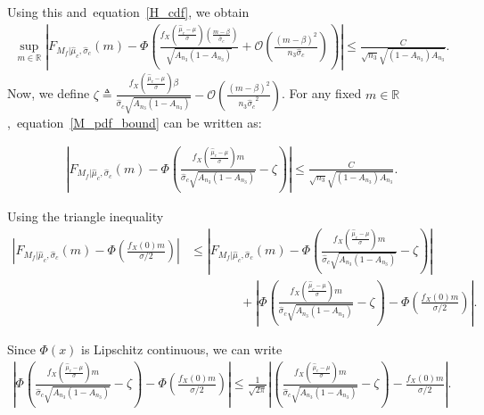 \documentclass[10pt]{article} %
\def\eqref#1{equation~\ref{#1}}
\theoremstyle{plain}
\theoremstyle{definition}
\theoremstyle{remark}
\newcommand{\bR}{\mathbb R}
\begin{document}
Using this and~\eqref{H_cdf}, we obtain
\begin{equation}
\begin{multlined}
\sup_{m \in \mathbb{R}}  \left|  F_{M_f |\hat{\mu}_c, \hat{\sigma}_c}(m) - \Phi\left(  \frac{ f_X \left(  \frac{\hat{\mu}_c - \mu}{\sigma} \right) \left( \frac{m - \beta}{\hat{\sigma}_c} \right) }{\sqrt{A_{n_3}(1-A_{n_3})}} +  \mathcal{O} \left(\frac{ (m - \beta)^2}{n_3 \hat{\sigma}_c}\right)  \right) \right |    \leq \frac{C}{\sqrt{n_3} \sqrt{(1 - A_{n_3})A_{n_3}}}. \label{M_pdf_bound}
\end{multlined}
\end{equation}
Now, we  define \( \zeta \triangleq \frac{  f_X \left(\frac{\hat{\mu}_c - \mu}{\sigma} \right) \beta }{  \hat{\sigma}_c \sqrt{A_{n_3}(1-A_{n_3})}} - \mathcal{O} \left(\frac{ (m - \beta)^2}{n_3 {\hat{\sigma}_{c}}^2}\right) \).  For any fixed \( m \in \bR \),~\eqref{M_pdf_bound} can be written as:

\begin{align}
    \left|  F_{M_f |\hat{\mu}_c, \hat{\sigma}_c}(m) - \Phi\left(  \frac{ f_X \left( \frac{\hat{\mu}_c - \mu}{\sigma} \right) m}{ \hat{\sigma}_c \sqrt{A_{n_3}(1-A_{n_3})}} - \zeta \right) \right |   \leq \frac{C}{\sqrt{n_3} \sqrt{(1 - A_{n_3})A_{n_3}}}. \label{Mf_cdf_zeta}
\end{align}

Using the triangle inequality
\begin{equation}
\begin{aligned}
  \left| F_{M_f |\hat{\mu}_c, \hat{\sigma}_c}(m)  - \Phi\left( \frac{ f_X(0) m}{ \sigma / 2 } \right) \right| 
& \leq  \left| F_{M_f |\hat{\mu}_c, \hat{\sigma}_c}(m) - \Phi\left( \frac{ f_X \left( \frac{\hat{\mu}_c - \mu}{\sigma} \right)  m}{ \hat{\sigma}_c \sqrt{A_{n_3}(1-A_{n_3})}} 
 - \zeta \right) \right|      \\  &\qquad \qquad + \left| \Phi\left(  \frac{ f_X \left( \frac{\hat{\mu}_c - \mu}{\sigma} \right) m}{ \hat{\sigma}_c \sqrt{A_{n_3}(1-A_{n_3})}} - \zeta \right) -  \Phi\left( \frac{ f_X(0) m}{ \sigma / 2 } \right)   \right|. \label{tringle_result}
\end{aligned}   
\end{equation}


Since \( \Phi(x)\) is Lipschitz continuous, we can write
\begin{align}
\left| \Phi\left( \frac{ f_X \left (\frac{\hat{\mu}_c - \mu }{\sigma}\right) m}{ \hat{\sigma}_c \sqrt{A_{n_3}(1-A_{n_3})}} - \zeta \right) - \Phi\left( \frac{ f_X(0) m}{ \sigma / 2 } \right) \right| 
\leq \frac{1}{\sqrt{2\pi}}  \left| \left(  \frac{ f_X \left (\frac{\hat{\mu}_c - \mu }{\sigma}\right) m}{ \hat{\sigma}_c \sqrt{A_{n_3}(1-A_{n_3})}} - \zeta \right) - \frac{ f_X(0) m}{ \sigma / 2 } \right|. \label{lipschtiz_result}
\end{align}
\end{document}
